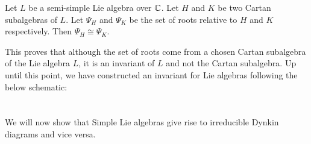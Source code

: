 \documentclass[a4paper]{article}
\begin{document}
\begin{prp}{}{} Let $L$ be a semi-simple Lie algebra over $\mathbb{C}$. Let $H$ and $K$ be two Cartan subalgebras of $L$. Let $\Psi_H$ and $\Psi_K$ be the set of roots relative to $H$ and $K$ respectively. Then $\Psi_H\cong\Psi_K$. 
\end{prp}

This proves that although the set of roots come from a chosen Cartan subalgebra of the Lie algebra $L$, it is an invariant of $L$ and not the Cartan subalgebra. Up until this point, we have constructed an invariant for Lie algebras following the below schematic: \\~\\
 \\

We will now show that Simple Lie algebras give rise to irreducible Dynkin diagrams and vice versa. 
\end{document}
